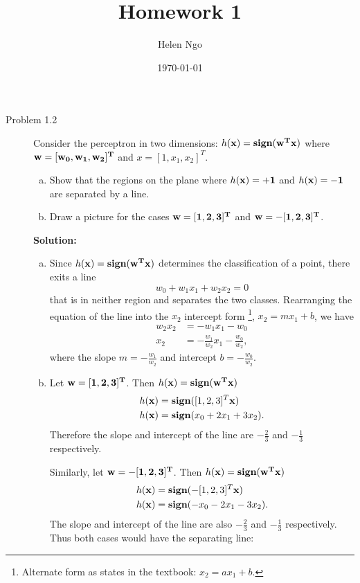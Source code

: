 \documentclass[a4paper]{article}
\title{Homework 1}
\author{Helen Ngo}
\date{\today}
\begin{document}
\lstset{language=Python}

\maketitle

\begin {description}

\item[Problem 1.2] Consider the perceptron in two dimensions: $h(\bf x) = sign(\bf w^T \bf x)$ where $\bf w = [w_0, w_1, w_2]^T$ and $x = [1, x_1, x_2]^T$. 
\begin{enumerate}[(a)]
\item Show that the regions on the plane where $h(\bf x) = +1$ and $h(\bf x) = -1$ are separated  by a line.
\item Draw a picture for the cases $\bf w = [1,2,3]^T$ and $\bf w = -[1,2,3]^T$.
\end{enumerate}

\smallskip

\textbf{Solution:}
\begin{doublespace}
\begin{enumerate}[(a)]

\item Since $h(\bf x) = sign(\bf w^T \bf x)$ determines the classification of a point, there exits a line
\[w_0 + w_1 x_1 + w_2 x_2 = 0\]
that is in neither region and separates the two classes. Rearranging the equation of the line into the $x_2$ intercept form \footnote{Alternate form as states in the textbook: $x_2 = ax_1+b$.}, $x_2 = mx_1+b$, we have
\begin{align*}
w_2 x_2 &= -w_1 x_1 - w_0\\
x_2 &= - \frac{w_1}{w_2} x_1 - \frac{w_0}{w_2},
\end{align*}
where the slope $m = - \frac{w_1}{w_2}$ and intercept $b = - \frac{w_0}{w_2}$.

\item Let $\bf w = [1,2,3]^T$. Then $h(\bf x) = sign(\bf w^T \bf x)$
\begin{align*}
h(\bf x) &= \textbf{sign}([1,2,3]^T \bf x) \\
h(\bf x) &= \textbf{sign}(x_0 + 2x_1 + 3x_2).
\end{align*}
Therefore the slope and intercept of the line are $-\frac{2}{3}$ and $-\frac{1}{3}$ respectively.


Similarly, let $\bf w = -[1,2,3]^T$. Then $h(\bf x) = sign(\bf w^T \bf x)$
\begin{align*}
h(\bf x) &= \textbf{sign}(-[1,2,3]^T \bf x) \\
h(\bf x) &= \textbf{sign}(-x_0 - 2x_1 - 3x_2).
\end{align*}
The slope and intercept of the line are also $-\frac{2}{3}$ and $-\frac{1}{3}$ respectively. Thus both cases would have the separating line:


\end{enumerate}
\end{doublespace}
\end{description}
\end{document}
